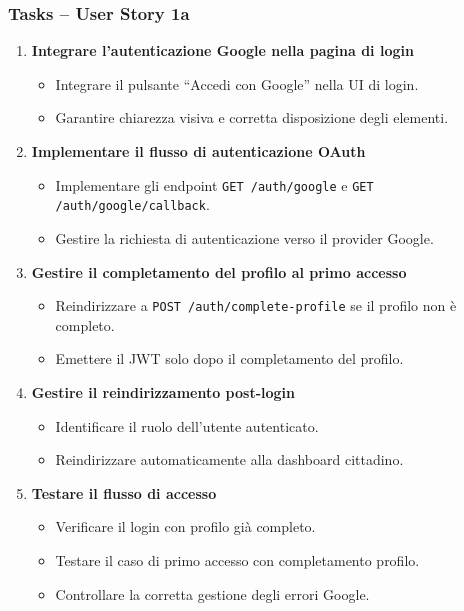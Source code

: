 \documentclass{article}
\begin{document}
\subsubsection{Tasks -- User Story 1a}
\begin{enumerate}
    \item \textbf{Integrare l'autenticazione Google nella pagina di login}
    \begin{itemize}
        \item Integrare il pulsante ``Accedi con Google'' nella UI di login.
        \item Garantire chiarezza visiva e corretta disposizione degli elementi.
    \end{itemize}

    \item \textbf{Implementare il flusso di autenticazione OAuth}
    \begin{itemize}
        \item Implementare gli endpoint \texttt{GET /auth/google} e \texttt{GET /auth/google/callback}.
        \item Gestire la richiesta di autenticazione verso il provider Google.
    \end{itemize}

    \item \textbf{Gestire il completamento del profilo al primo accesso}
    \begin{itemize}
        \item Reindirizzare a \texttt{POST /auth/complete-profile} se il profilo non è completo.
        \item Emettere il JWT solo dopo il completamento del profilo.
    \end{itemize}

    \item \textbf{Gestire il reindirizzamento post-login}
    \begin{itemize}
        \item Identificare il ruolo dell'utente autenticato.
        \item Reindirizzare automaticamente alla dashboard cittadino.
    \end{itemize}

    \item \textbf{Testare il flusso di accesso}
    \begin{itemize}
        \item Verificare il login con profilo già completo.
        \item Testare il caso di primo accesso con completamento profilo.
        \item Controllare la corretta gestione degli errori Google.
    \end{itemize}
\end{enumerate}
\end{document}
